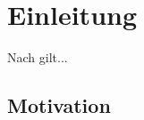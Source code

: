 \section{Einleitung\label{sec:1}}

Nach \citet{Hull2000} gilt...  %

\subsection{Motivation\label{sec:1.1}}


